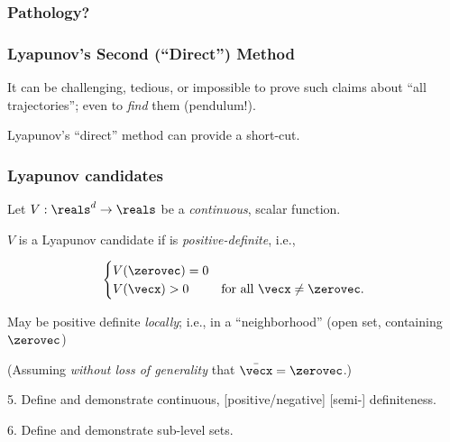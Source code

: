 \documentclass[12pt]{beamer}
\begin{document}
\begin{frame}
\frametitle{Pathology?}
\end{frame}



\begin{frame}
\frametitle{Lyapunov's Second (``Direct'') Method}

\begin{itemize}
\vitem
It can be challenging, tedious, or impossible
to prove such claims about ``all trajectories'';
even to \emph{find} them (pendulum!).

\vitem
Lyapunov's ``direct'' method can provide a short-cut.

\end{itemize}

\vfill\null
\end{frame}




\begin{frame}
\frametitle{Lyapunov candidates}

\begin{itemize}

\vitem
Let $V : \reals^d \to \reals$ be a \emph{continuous}, scalar function.

\vitem
$V$ is a Lyapunov candidate if is \emph{positive-definite}, i.e.,

\[
\begin{cases}
	V(\zerovec) = 0 &\\
	V(\vecx) > 0 & \text{for all $\vecx \neq \zerovec$}.
\end{cases}
\]

\vitem
May be positive definite \emph{locally}; i.e., in a ``neighborhood''
(open set, containing $\zerovec$)

\vitem
(Assuming \emph{without loss of generality} that $\bar{\vecx} = \zerovec$.)

\end{itemize}
\vfill\null
\end{frame}




\begin{frame}

5. Define and demonstrate continuous, [positive/negative] [semi-] definiteness.

6. Define and demonstrate sub-level sets.

\end{frame}
\end{document}
